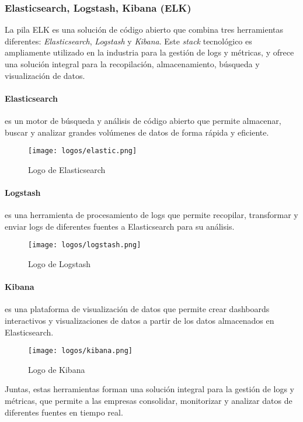 \subsubsection{Elasticsearch, Logstash, Kibana (ELK)}
La pila ELK es una solución de código abierto que combina tres herramientas
diferentes: \textit{Elasticsearch}, \textit{Logstash} y \textit{Kibana}. Este
\textit{stack} tecnológico es ampliamente utilizado en la industria para la
gestión de logs y métricas, y ofrece una solución integral para la recopilación,
almacenamiento, búsqueda y visualización de datos.

\paragraph{Elasticsearch} es un motor de búsqueda y análisis de código abierto
que permite almacenar, buscar y analizar grandes volúmenes de datos de forma
rápida y eficiente.

\begin{figure}[H]
	\centering
	\texttt{[image: logos/elastic.png]}
	\caption{Logo de Elasticsearch~\textregistered}
\end{figure}

\paragraph{Logstash} es una herramienta de procesamiento de logs que permite
recopilar, transformar y enviar logs de diferentes fuentes a Elasticsearch para
su análisis.

\begin{figure}[H]
	\centering
	\texttt{[image: logos/logstash.png]}
	\caption{Logo de Logstash~\textregistered}
\end{figure}

\paragraph{Kibana} es una plataforma de visualización de datos que permite
crear dashboards interactivos y visualizaciones de datos a partir de los datos
almacenados en Elasticsearch.

\begin{figure}[H]
	\centering
	\texttt{[image: logos/kibana.png]}
	\caption{Logo de Kibana~\textregistered}
\end{figure}

Juntas, estas herramientas forman una solución integral para la
gestión de logs y métricas, que permite a las empresas consolidar, monitorizar y
analizar datos de diferentes fuentes en tiempo real.


